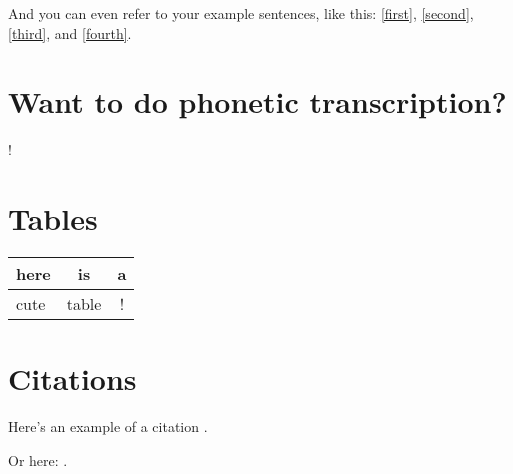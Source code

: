 \documentclass[english, 11pt]{article}
\begin{document}
\begin{exe}
	\ex 
	\begin{xlist}
		\label{first}
		\label{second}
		\label{third}
		\label{fourth}
	\end{xlist}
\end{exe}

And you can even refer to your example sentences, like this: \ref{first}, \ref{second}, \ref{third}, and \ref{fourth}.



\section{Want to do phonetic transcription?}

! 


\section{Tables}

\begin{tabular}{l | c | c} \hline \hline
here & is & a \\ \hline 
cute & table& ! \\ \hline \hline
\end{tabular}

\section{Citations}

Here's an example of a citation \citep{lol}.

Or here: \cite{lol}.



\end{document}
